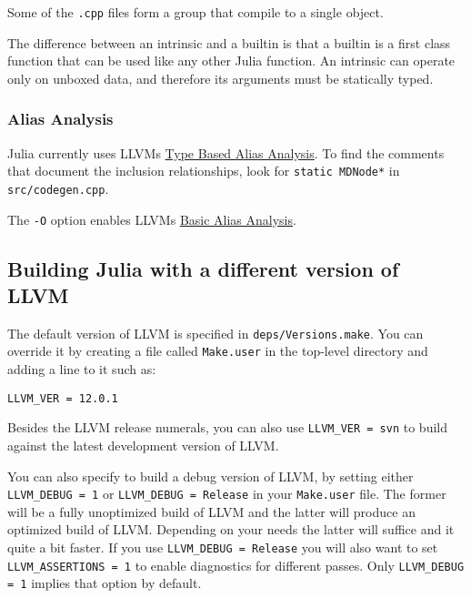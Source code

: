 Some of the \texttt{.cpp} files form a group that compile to a single object.



The difference between an intrinsic and a builtin is that a builtin is a first class function that can be used like any other Julia function.  An intrinsic can operate only on unboxed data, and therefore its arguments must be statically typed.



\hypertarget{8366324567299313031}{}


\subsubsection{Alias Analysis}



Julia currently uses LLVM{\textquotesingle}s \href{http://llvm.org/docs/LangRef.html\#tbaa-metadata}{Type Based Alias Analysis}. To find the comments that document the inclusion relationships, look for \texttt{static MDNode*} in \texttt{src/codegen.cpp}.



The \texttt{-O} option enables LLVM{\textquotesingle}s \href{http://llvm.org/docs/AliasAnalysis.html\#the-basicaa-pass}{Basic Alias Analysis}.



\hypertarget{13120458447023898074}{}


\subsection{Building Julia with a different version of LLVM}



The default version of LLVM is specified in \texttt{deps/Versions.make}. You can override it by creating a file called \texttt{Make.user} in the top-level directory and adding a line to it such as:




\begin{lstlisting}
LLVM_VER = 12.0.1
\end{lstlisting}



Besides the LLVM release numerals, you can also use \texttt{LLVM\_VER = svn} to build against the latest development version of LLVM.



You can also specify to build a debug version of LLVM, by setting either \texttt{LLVM\_DEBUG = 1} or \texttt{LLVM\_DEBUG = Release} in your \texttt{Make.user} file. The former will be a fully unoptimized build of LLVM and the latter will produce an optimized build of LLVM. Depending on your needs the latter will suffice and it quite a bit faster. If you use \texttt{LLVM\_DEBUG = Release} you will also want to set \texttt{LLVM\_ASSERTIONS = 1} to enable diagnostics for different passes. Only \texttt{LLVM\_DEBUG = 1} implies that option by default.



